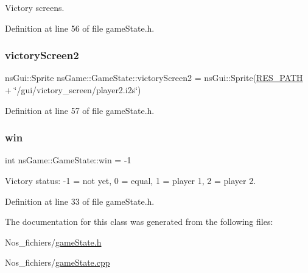 Victory screens. 



Definition at line 56 of file game\+State.\+h.

\mbox{\label{classns_game_1_1_game_state_ab94cabb5a2665d1afc31937b84880b6e}} 
\subsubsection{\texorpdfstring{victory\+Screen2}{victoryScreen2}}
{\footnotesize\ttfamily ns\+Gui\+::\+Sprite ns\+Game\+::\+Game\+State\+::victory\+Screen2 = ns\+Gui\+::\+Sprite(\hyperlink{definitions_8h_a793644bd88146828177a2a4f57e3bf01}{R\+E\+S\+\_\+\+P\+A\+TH} + \char`\"{}/gui/victory\+\_\+screen/player2.\+i2s\char`\"{})}



Definition at line 57 of file game\+State.\+h.

\mbox{\label{classns_game_1_1_game_state_aa5b4cb6af0e806d442e5291578a6822a}} 
\subsubsection{\texorpdfstring{win}{win}}
{\footnotesize\ttfamily int ns\+Game\+::\+Game\+State\+::win = -\/1}



Victory status\+: -\/1 = not yet, 0 = equal, 1 = player 1, 2 = player 2. 



Definition at line 33 of file game\+State.\+h.



The documentation for this class was generated from the following files\+:\begin{DoxyCompactItemize}
\item 
Nos\+\_\+fichiers/\hyperlink{game_state_8h}{game\+State.\+h}\item 
Nos\+\_\+fichiers/\hyperlink{game_state_8cpp}{game\+State.\+cpp}\end{DoxyCompactItemize}
